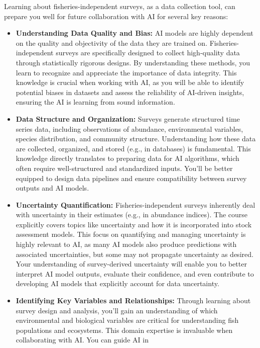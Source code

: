 \documentclass[
  letterpaper,
  oneside,
  open=any]{scrbook}
\providecommand{\tightlist}{%
  \setlength{\itemsep}{0pt}\setlength{\parskip}{0pt}}\usepackage{longtable,booktabs,array}
\begin{document}
Learning about fisheries-independent surveys, as a data collection tool,
can prepare you well for future collaboration with AI for several key
reasons:

\begin{itemize}
\tightlist
\item
  \textbf{Understanding Data Quality and Bias:} AI models are highly
  dependent on the quality and objectivity of the data they are trained
  on. Fisheries-independent surveys are specifically designed to collect
  high-quality data through statistically rigorous designs. By
  understanding these methods, you learn to recognize and appreciate the
  importance of data integrity. This knowledge is crucial when working
  with AI, as you will be able to identify potential biases in datasets
  and assess the reliability of AI-driven insights, ensuring the AI is
  learning from sound information.
\item
  \textbf{Data Structure and Organization:} Surveys generate structured
  time series data, including observations of abundance, environmental
  variables, species distribution, and community structure.
  Understanding how these data are collected, organized, and stored
  (e.g., in databases) is fundamental. This knowledge directly
  translates to preparing data for AI algorithms, which often require
  well-structured and standardized inputs. You'll be better equipped to
  design data pipelines and ensure compatibility between survey outputs
  and AI models.
\item
  \textbf{Uncertainty Quantification:} Fisheries-independent surveys
  inherently deal with uncertainty in their estimates (e.g., in
  abundance indices). The course explicitly covers topics like
  uncertainty and how it is incorporated into stock assessment models.
  This focus on quantifying and managing uncertainty is highly relevant
  to AI, as many AI models also produce predictions with associated
  uncertainties, but some may not propagate uncertainty as desired. Your
  understanding of survey-derived uncertainty will enable you to better
  interpret AI model outputs, evaluate their confidence, and even
  contribute to developing AI models that explicitly account for data
  uncertainty.
\item
  \textbf{Identifying Key Variables and Relationships:} Through learning
  about survey design and analysis, you'll gain an understanding of
  which environmental and biological variables are critical for
  understanding fish populations and ecosystems. This domain expertise
  is invaluable when collaborating with AI. You can guide AI in

\end{itemize}
\end{document}
